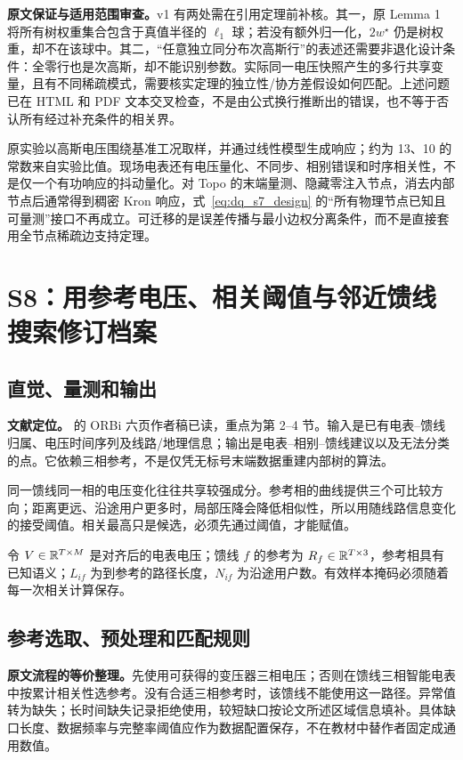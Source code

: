 \textbf{原文保证与适用范围审查。}v1 有两处需在引用定理前补核。其一，原 Lemma 1 将所有树权重集合包含于真值半径的 $\ell_1$ 球；若没有额外归一化，$2w^\star$ 仍是树权重，却不在该球中。其二，“任意独立同分布次高斯行”的表述还需要非退化设计条件：全零行也是次高斯，却不能识别参数。实际同一电压快照产生的多行共享变量，且有不同稀疏模式，需要核实定理的独立性/协方差假设如何匹配。上述问题已在 HTML 和 PDF 文本交叉检查，不是由公式换行推断出的错误，也不等于否认所有经过补充条件的相关界。

原实验以高斯电压围绕基准工况取样，并通过线性模型生成响应；约为 13、10 的常数来自实验比值。现场电表还有电压量化、不同步、相别错误和时序相关性，不是仅一个有功响应的抖动量化。对 Topo 的末端量测、隐藏零注入节点，消去内部节点后通常得到稠密 Kron 响应，式~\eqref{eq:dq_s7_design} 的“所有物理节点已知且可量测”接口不再成立。可迁移的是误差传播与最小边权分离条件，而不是直接套用全节点稀疏边支持定理。

\section{S8：用参考电压、相关阈值与邻近馈线搜索修订档案}
\label{sec:dq_s8}

\subsection{直觉、量测和输出}

\textbf{文献定位。}\citet{S8} 的 ORBi 六页作者稿已读，重点为第 2--4 节。输入是已有电表--馈线归属、电压时间序列及线路/地理信息；输出是电表--相别--馈线建议以及无法分类的点。它依赖三相参考，不是仅凭无标号末端数据重建内部树的算法。

同一馈线同一相的电压变化往往共享较强成分。参考相的曲线提供三个可比较方向；距离更远、沿途用户更多时，局部压降会降低相似性，所以用随线路信息变化的接受阈值。相关最高只是候选，必须先通过阈值，才能赋值。

令 $V\in\mathbb{R}^{T\times M}$ 是对齐后的电表电压；馈线 $f$ 的参考为
$R_f\in\mathbb{R}^{T\times3}$，参考相具有已知语义；$L_{if}$ 为到参考的路径长度，$N_{if}$ 为沿途用户数。有效样本掩码必须随着每一次相关计算保存。

\subsection{参考选取、预处理和匹配规则}

\textbf{原文流程的等价整理。}先使用可获得的变压器三相电压；否则在馈线三相智能电表中按累计相关性选参考。没有合适三相参考时，该馈线不能使用这一路径。异常值转为缺失；长时间缺失记录拒绝使用，较短缺口按论文所述区域信息填补。具体缺口长度、数据频率与完整率阈值应作为数据配置保存，不在教材中替作者固定成通用数值。

